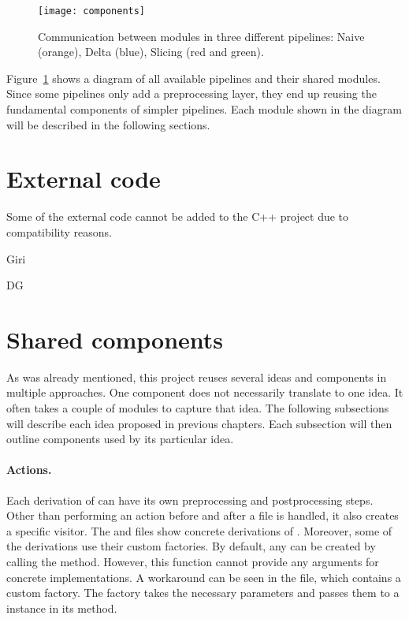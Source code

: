 \begin{figure}[h]\centering
\texttt{[image: components]}
\caption{Communication between modules in three different pipelines:
Naive (orange), Delta (blue), Slicing (red and green).}
\label{img:components}
\end{figure}

Figure~\ref{img:components} shows a diagram of all available pipelines and 
their shared modules. 
Since some pipelines only add a preprocessing layer, they end up reusing 
the fundamental components of simpler pipelines.
Each module shown in the diagram will be described in the following sections.

\section{External code}

Some of the external code cannot be added to the C++ project due to 
compatibility reasons.

Giri

DG

\section{Shared components}

As was already mentioned, this project reuses several ideas and components 
in multiple approaches. 
One component does not necessarily translate to one idea. 
It often takes a couple of modules to capture that idea. 
The following subsections will describe each idea proposed in previous 
chapters. 
Each subsection will then outline components used by its particular idea.

\paragraph{Actions.} Each derivation of  can have 
its own preprocessing and postprocessing steps.
Other than performing an action before and after a file is handled, it also 
creates a specific visitor.
The  and  files show concrete derivations 
of .
Moreover, some of the derivations use their custom factories.
By default, any  can be created by calling 
the  method.
However, this function cannot provide any arguments for concrete 
 implementations.
A workaround can be seen in the  file, which contains 
a custom factory.
The factory takes the necessary parameters and passes them to 
a  instance in its  method.

